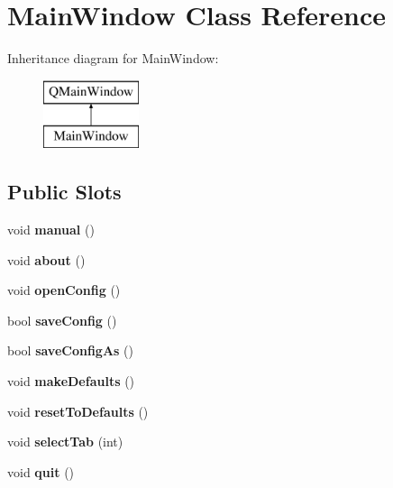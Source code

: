 \hypertarget{class_main_window}{}\section{Main\+Window Class Reference}
\label{class_main_window}
Inheritance diagram for Main\+Window\+:\begin{figure}[H]
\begin{center}
\leavevmode
\includegraphics[height=2.000000cm]{class_main_window}
\end{center}
\end{figure}
\subsection*{Public Slots}
\begin{DoxyCompactItemize}
\item 
\mbox{\label{class_main_window_a2670f0411425979516c0a76f0a107c91}} 
void {\bfseries manual} ()
\item 
\mbox{\label{class_main_window_a7be6a5d98970ac1a6296c6f9aee1e9bb}} 
void {\bfseries about} ()
\item 
\mbox{\label{class_main_window_af0d5a43788f46d7bb62c5394cff54190}} 
void {\bfseries open\+Config} ()
\item 
\mbox{\label{class_main_window_ab2d0912186a241c25daa1a8e12c3dfdd}} 
bool {\bfseries save\+Config} ()
\item 
\mbox{\label{class_main_window_a6a294f349550e169b777b202275bf8d5}} 
bool {\bfseries save\+Config\+As} ()
\item 
\mbox{\label{class_main_window_a686b4b149395eb4917fb5585262f9d12}} 
void {\bfseries make\+Defaults} ()
\item 
\mbox{\label{class_main_window_a2f1707d863ac6cd5bb9264437d7b9291}} 
void {\bfseries reset\+To\+Defaults} ()
\item 
\mbox{\label{class_main_window_aae188d3d8aa8ac4ce94ad1d1875b6cfb}} 
void {\bfseries select\+Tab} (int)
\item 
\mbox{\label{class_main_window_a542a7527ced73b2c9bc14f8dc9661a66}} 
void {\bfseries quit} ()
\end{DoxyCompactItemize}
